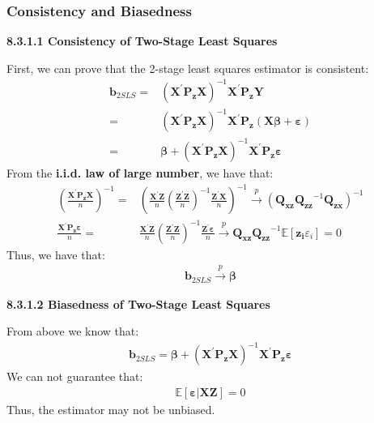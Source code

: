 \documentclass{article}
\begin{document}
\subsubsection{Consistency and Biasedness}
\centerline{\textbf{8.3.1.1 Consistency of Two-Stage Least Squares}}
First, we can prove that the 2-stage least squares estimator is consistent:
	\begin{align*}
		\boldsymbol{b}_{2SLS} = &(\boldsymbol{X}^\prime \boldsymbol{P_z} \boldsymbol{X})^{-1} \boldsymbol{X}^\prime \boldsymbol{P_z} \boldsymbol{Y}\\ = &
		(\boldsymbol{X}^\prime \boldsymbol{P_z} \boldsymbol{X})^{-1} \boldsymbol{X}^\prime \boldsymbol{P_z} (\boldsymbol{X} \boldsymbol{\beta} + \boldsymbol{\varepsilon})\\ = &
		\boldsymbol{\beta} + (\boldsymbol{X}^\prime \boldsymbol{P_z} \boldsymbol{X})^{-1} \boldsymbol{X}^\prime \boldsymbol{P_z} \boldsymbol{\varepsilon}
	\end{align*}
From the \textbf{i.i.d. law of large number}, we have that:
	\begin{align*}
		\left( \frac{\boldsymbol{X}^\prime \boldsymbol{P_z} \boldsymbol{X}}{n} \right)^{-1} = & \left( \frac{\boldsymbol{X}^\prime \boldsymbol{Z}}{n} \left( \frac{\boldsymbol{Z}^\prime \boldsymbol{Z}}{n} \right)^{-1} \frac{\boldsymbol{Z}^\prime \boldsymbol{X}}{n} \right)^{-1} \xrightarrow{p} (\boldsymbol{Q_{xz}} \boldsymbol{Q_{zz}}^{-1} \boldsymbol{Q_{zx}})^{-1}\\
		\frac{\boldsymbol{X}^\prime \boldsymbol{P_z} \boldsymbol{\varepsilon}}{n} = &\frac{\boldsymbol{X}^\prime \boldsymbol{Z}}{n} \left( \frac{\boldsymbol{Z}^\prime \boldsymbol{Z}}{n} \right)^{-1} \frac{\boldsymbol{Z}^\prime \boldsymbol{\varepsilon}}{n} \xrightarrow{p} \boldsymbol{Q_{xz}} \boldsymbol{Q_{zz}}^{-1} \mathbb{E}[\boldsymbol{z_i} \varepsilon_i] = 0
	\end{align*}
Thus, we have that:
	\begin{align*}
		\boldsymbol{b}_{2SLS} \xrightarrow{p} \boldsymbol{\beta}
	\end{align*}

\centerline{\textbf{8.3.1.2 Biasedness of Two-Stage Least Squares}}
From above we know that:
	\begin{align*}
		\boldsymbol{b}_{2SLS} = \boldsymbol{\beta} + (\boldsymbol{X}^\prime \boldsymbol{P_z} \boldsymbol{X})^{-1} \boldsymbol{X}^\prime \boldsymbol{P_z} \boldsymbol{\varepsilon}
	\end{align*}
We can not guarantee that:
	\begin{align*}
		\mathbb{E}[\boldsymbol{\varepsilon} | \boldsymbol{X} \boldsymbol{Z}] = 0
	\end{align*}
Thus, the estimator may not be unbiased.
\end{document}
